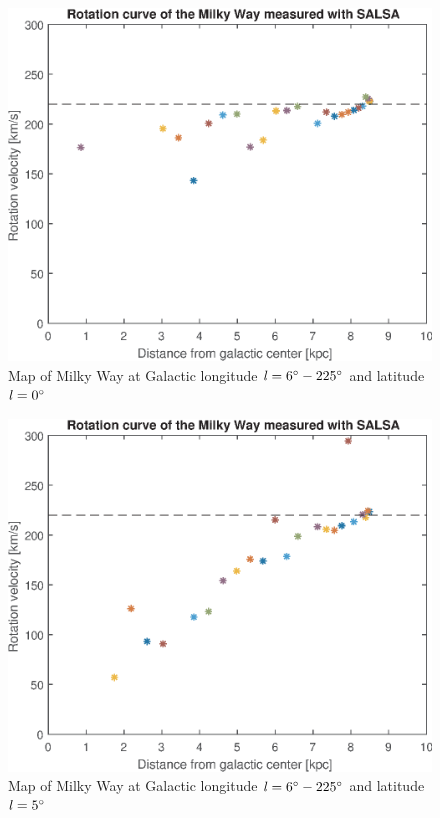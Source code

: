 \documentclass[fleqn,usenatbib]{mnras}
\begin{document}
\begin{figure}
      \includegraphics[width=\columnwidth]{RotationCurve_1}
      \caption{Map of Milky Way at Galactic longitude $\mathit{l}=6\hbox{$^\circ$}-225\hbox{$^\circ$}$ and latitude $\mathit{l}=0\hbox{$^\circ$}$}
      \label{fig:rot-1}
\end{figure}

\begin{figure}
      \includegraphics[width=\columnwidth]{RotationCurve_2}
      \caption{Map of Milky Way at Galactic longitude $\mathit{l}=6\hbox{$^\circ$}-225\hbox{$^\circ$}$ and latitude $\mathit{l}=5\hbox{$^\circ$}$}
      \label{fig:rot-2}
\end{figure}
\end{document}
